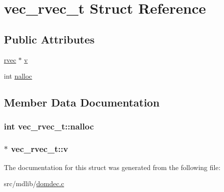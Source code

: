 \hypertarget{structvec__rvec__t}{\section{vec\-\_\-rvec\-\_\-t \-Struct \-Reference}
\label{structvec__rvec__t}
}
\subsection*{\-Public \-Attributes}
\begin{DoxyCompactItemize}
\item 
\hyperlink{share_2template_2gromacs_2types_2simple_8h_aa02a552a4abd2f180c282a083dc3a999}{rvec} $\ast$ \hyperlink{structvec__rvec__t_ae142d72d6f7d8d420c3c55c45933d3e7}{v}
\item 
int \hyperlink{structvec__rvec__t_a3f6152d37b6e6392f734c639e3c72ef8}{nalloc}
\end{DoxyCompactItemize}


\subsection{\-Member \-Data \-Documentation}
\hypertarget{structvec__rvec__t_a3f6152d37b6e6392f734c639e3c72ef8}{
\subsubsection[{nalloc}]{\setlength{\rightskip}{0pt plus 5cm}int {\bf vec\-\_\-rvec\-\_\-t\-::nalloc}}}\label{structvec__rvec__t_a3f6152d37b6e6392f734c639e3c72ef8}
\hypertarget{structvec__rvec__t_ae142d72d6f7d8d420c3c55c45933d3e7}{
\subsubsection[{v}]{$\ast$ {\bf vec\-\_\-rvec\-\_\-t\-::v}}}\label{structvec__rvec__t_ae142d72d6f7d8d420c3c55c45933d3e7}


\-The documentation for this struct was generated from the following file\-:\begin{DoxyCompactItemize}
\item 
src/mdlib/\hyperlink{domdec_8c}{domdec.\-c}\end{DoxyCompactItemize}
